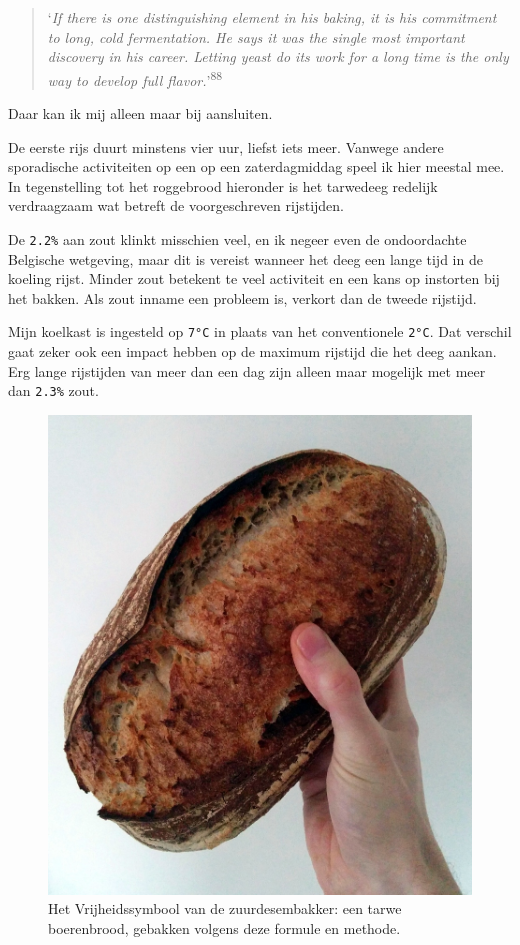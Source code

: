 \documentclass[
  11pt,
  dutch,
]{memoir}
\begin{document}
\begin{quote}
`\emph{If there is one distinguishing element in his baking, it is his
commitment to long, cold fermentation. He says it was the single most
important discovery in his career. Letting yeast do its work for a long
time is the only way to develop full flavor.}'\textsuperscript{88}
\end{quote}

Daar kan ik mij alleen maar bij aansluiten.

De eerste rijs duurt minstens vier uur, liefst iets meer. Vanwege andere
sporadische activiteiten op een op een zaterdagmiddag speel ik hier
meestal mee. In tegenstelling tot het roggebrood hieronder is het
tarwedeeg redelijk verdraagzaam wat betreft de voorgeschreven
rijstijden.

De \texttt{2.2\%} aan zout klinkt misschien veel, en ik negeer even de
ondoordachte Belgische wetgeving, maar dit is vereist wanneer het deeg
een lange tijd in de koeling rijst. Minder zout betekent te veel
activiteit en een kans op instorten bij het bakken. Als zout inname een
probleem is, verkort dan de tweede rijstijd.

Mijn koelkast is ingesteld op \texttt{7°C} in plaats van het
conventionele \texttt{2°C}. Dat verschil gaat zeker ook een impact
hebben op de maximum rijstijd die het deeg aankan. Erg lange rijstijden
van meer dan een dag zijn alleen maar mogelijk met meer dan
\texttt{2.3\%} zout.

\begin{figure}
    \centering
    \includegraphics{img/bw/succes.jpg}
    \caption[Een tarwe boerenbrood.]{Het Vrijheidssymbool van de zuurdesembakker: een tarwe boerenbrood, gebakken volgens deze formule en methode.}
\end{figure}
\end{document}
